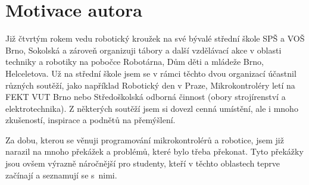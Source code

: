 
\addtocounter{footnote}{-1} %



%

\section{Motivace autora}

Již čtvrtým rokem vedu robotický kroužek na své bývalé střední škole SPŠ a VOŠ Brno, Sokolská a zároveň organizuji tábory a další vzdělávací akce v oblasti techniky a robotiky na pobočce Robotárna, Dům děti a mládeže Brno, Helceletova.
Už na střední škole jsem se v rámci těchto dvou organizací účastnil různých soutěží, jako například Robotický den v Praze, Mikrokontroléry letí na FEKT VUT Brno nebo Středoškolská odborná činnost (obory strojírenství a elektrotechnika). 
Z některých soutěží jsem si dovezl cenná umístění, ale i mnoho zkušeností, inspirace a podnětů na přemýšlení.


Za dobu, kterou se věnuji programování mikrokontrolérů a robotice, jsem již narazil na mnoho překážek a problémů, které bylo třeba překonat. 
Tyto překážky jsou ovšem výrazně náročnější pro studenty, kteří v těchto oblastech teprve začínají a seznamují se s~nimi. 

